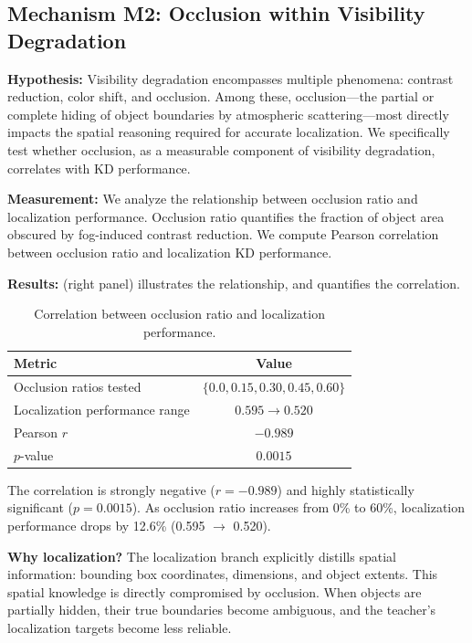 \subsection{Mechanism M2: Occlusion within Visibility Degradation}

\textbf{Hypothesis:} Visibility degradation encompasses multiple phenomena: contrast reduction, color shift, and occlusion. Among these, occlusion---the partial or complete hiding of object boundaries by atmospheric scattering---most directly impacts the spatial reasoning required for accurate localization. We specifically test whether occlusion, as a measurable component of visibility degradation, correlates with KD performance.

\textbf{Measurement:} We analyze the relationship between occlusion ratio and localization performance. Occlusion ratio quantifies the fraction of object area obscured by fog-induced contrast reduction. We compute Pearson correlation between occlusion ratio and localization KD performance.

\textbf{Results:}  (right panel) illustrates the relationship, and  quantifies the correlation.

\begin{table}[htbp]
\centering
\caption{Correlation between occlusion ratio and localization performance.}
\label{tab:occlusion_corr}
\begin{tabular}{@{}lc@{}}
\toprule
Metric & Value \\
\midrule
Occlusion ratios tested & $\{0.0, 0.15, 0.30, 0.45, 0.60\}$ \\
Localization performance range & $0.595 \to 0.520$ \\
Pearson $r$ & $\mathbf{-0.989}$ \\
$p$-value & $\mathbf{0.0015}$ \\
\bottomrule
\end{tabular}
\end{table}

The correlation is strongly negative ($r = -0.989$) and highly statistically significant ($p = 0.0015$). As occlusion ratio increases from 0\% to 60\%, localization performance drops by 12.6\% (0.595 $\to$ 0.520).

\textbf{Why localization?} The localization branch explicitly distills spatial information: bounding box coordinates, dimensions, and object extents. This spatial knowledge is directly compromised by occlusion. When objects are partially hidden, their true boundaries become ambiguous, and the teacher's localization targets become less reliable.

